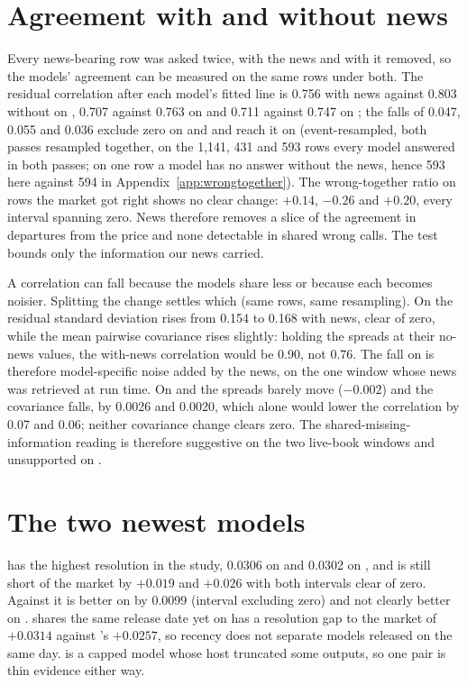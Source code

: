 \section{Agreement with and without news}
\label{app:newsagree}
Every news-bearing row was asked twice, with the news and with it removed, so
the models' agreement can be measured on the same rows under both. The residual
correlation after each model's fitted line is 0.756 with news against 0.803
without on \winA, 0.707 against 0.763 on \winB and 0.711 against 0.747 on
\winC; the falls of 0.047, 0.055 and 0.036 exclude zero on \winA and \winB and
reach it on \winC (event-resampled, both passes resampled together, on the
1{,}141, 431 and 593 rows every model answered in both passes; on one \winC row
a model has no answer without the news, hence 593 here against 594 in
Appendix~\ref{app:wrongtogether}). The wrong-together ratio on rows the market got right shows no
clear change: $+0.14$, $-0.26$ and $+0.20$, every interval spanning zero. News
therefore removes a slice of the agreement in departures from the price and none
detectable in shared wrong calls. The test bounds only the information our news
carried.

A correlation can fall because the models share less or because each becomes
noisier. Splitting the change settles which (same rows, same resampling). On
\winA the residual standard deviation rises from 0.154 to 0.168 with news, clear
of zero, while the mean pairwise covariance rises slightly: holding the spreads
at their no-news values, the with-news correlation would be 0.90, not 0.76. The
fall on \winA is therefore model-specific noise added by the news, on the one
window whose news was retrieved at run time. On \winB and \winC the spreads barely move
($-0.002$) and the covariance falls, by 0.0026 and 0.0020, which alone would
lower the correlation by 0.07 and 0.06; neither covariance change clears zero.
The shared-missing-information reading is therefore suggestive on the two
live-book windows and unsupported on \winA.

\section{The two newest models}
\label{app:newest}
\mGptFiveFive has the highest resolution in the study, 0.0306 on \winB and
0.0302 on \winC, and is still short of the market by $+0.019$ and $+0.026$ with
both intervals clear of zero. Against \mGptFiveTwo it is better on \kalshi by
0.0099 (interval excluding zero) and not clearly better on \polymarket.
\mDeepSeekVFourPro shares the same release date yet on \winC has a resolution gap
to the market of $+0.0314$ against \mGptFiveFive's $+0.0257$, so recency does
not separate models released on the same day. \mDeepSeekVFourPro is a capped
model whose host truncated some outputs, so one pair is thin evidence either way.

